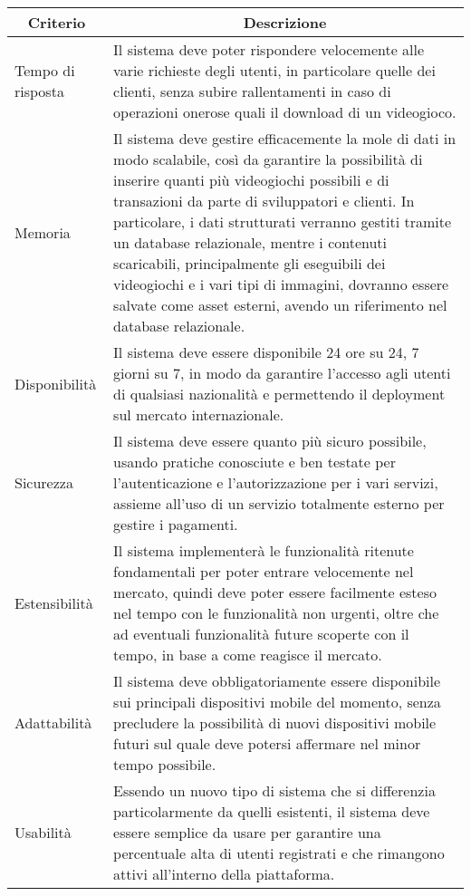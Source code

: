 \begin{center}
	\begin{tabular}{||l | p{30em}||} 
	\hline
	\multicolumn{1}{||c|}{\textbf{Criterio}} & \multicolumn{1}{c||}{\textbf{Descrizione}} \\
	\hline\hline
	Tempo di risposta & Il sistema deve poter rispondere velocemente alle varie richieste degli utenti, in particolare quelle dei clienti, senza subire rallentamenti in caso di operazioni onerose quali il download di un videogioco. \\ 
	\hline
	Memoria & Il sistema deve gestire efficacemente la mole di dati in modo scalabile, così da garantire la possibilità di inserire quanti più videogiochi possibili e di transazioni da parte di sviluppatori e clienti. In particolare, i dati strutturati verranno gestiti tramite un database relazionale, mentre i contenuti scaricabili, principalmente gli eseguibili dei videogiochi e i vari tipi di immagini, dovranno essere salvate come asset esterni, avendo un riferimento nel database relazionale. \\
	\hline
	Disponibilità & Il sistema deve essere disponibile 24 ore su 24, 7 giorni su 7, in modo da garantire l’accesso agli utenti di qualsiasi nazionalità e permettendo il deployment sul mercato internazionale. \\
	\hline
	Sicurezza & Il sistema deve essere quanto più sicuro possibile, usando pratiche conosciute e ben testate per l’autenticazione e l’autorizzazione per i vari servizi, assieme all’uso di un servizio totalmente esterno per gestire i pagamenti. \\
	\hline
	Estensibilità & Il sistema implementerà le funzionalità ritenute fondamentali per poter entrare velocemente nel mercato, quindi deve poter essere facilmente esteso nel tempo con le funzionalità non urgenti, oltre che ad eventuali funzionalità future scoperte con il tempo, in base a come reagisce il mercato. \\
	\hline
	Adattabilità & Il sistema deve obbligatoriamente essere disponibile sui principali dispositivi mobile del momento, senza precludere la possibilità di nuovi dispositivi mobile futuri sul quale deve potersi affermare nel minor tempo possibile. \\
	\hline
	Usabilità & Essendo un nuovo tipo di sistema che si differenzia particolarmente da quelli esistenti, il sistema deve essere semplice da usare per garantire una percentuale alta di utenti registrati e che rimangono attivi all’interno della piattaforma. \\
	\hline
   \end{tabular}
\end{center}


